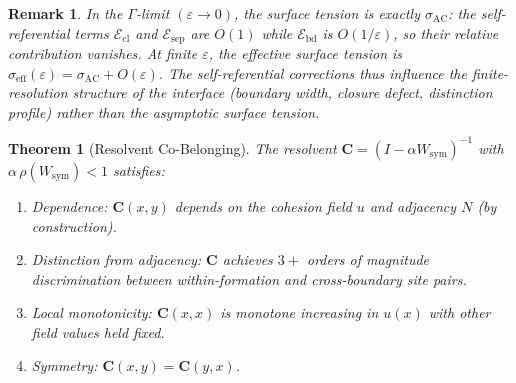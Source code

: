 \documentclass[lettersize,journal]{IEEEtran}
\newtheorem{theorem}{Theorem}
\newtheorem{remark}{Remark}
\begin{document}
\begin{remark}
In the $\Gamma$-limit $(\varepsilon \to 0)$, the surface tension is exactly $\sigma_{\mathrm{AC}}$: the self-referential terms $\mathcal{E}_{\mathrm{cl}}$ and $\mathcal{E}_{\mathrm{sep}}$ are $O(1)$ while $\mathcal{E}_{\mathrm{bd}}$ is $O(1/\varepsilon)$, so their relative contribution vanishes. At finite $\varepsilon$, the effective surface tension is $\sigma_{\mathrm{eff}}(\varepsilon) = \sigma_{\mathrm{AC}} + O(\varepsilon)$. The self-referential corrections thus influence the \emph{finite-resolution} structure of the interface (boundary width, closure defect, distinction profile) rather than the asymptotic surface tension.
\end{remark}

\begin{theorem}[Resolvent Co-Belonging]
\label{thm:resolvent}
The resolvent $\mathbf{C} = (I - \alpha W_{\mathrm{sym}})^{-1}$ with $\alpha\,\rho(W_{\mathrm{sym}}) < 1$ satisfies:
\begin{enumerate}
\item[\textbf{C1}] \emph{Dependence:} $\mathbf{C}(x,y)$ depends on the cohesion field $u$ and adjacency $N$ (by construction).
\item[\textbf{C2}] \emph{Distinction from adjacency:} $\mathbf{C}$ achieves $3+$ orders of magnitude discrimination between within-formation and cross-boundary site pairs.
\item[\textbf{C3$''$}] \emph{Local monotonicity:} $\mathbf{C}(x,x)$ is monotone increasing in $u(x)$ with other field values held fixed.
\item[\textbf{C4}] \emph{Symmetry:} $\mathbf{C}(x,y) = \mathbf{C}(y,x)$.
\end{enumerate}
\end{theorem}
\end{document}
